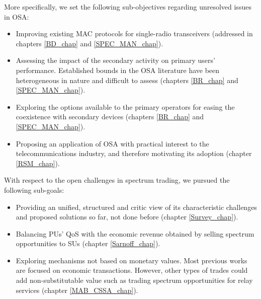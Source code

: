 More specifically, we set the following sub-objectives regarding unresolved issues in OSA: 
\begin{itemize}
\item Improving existing MAC protocols for single-radio transceivers (addressed in chapters \ref{BD_chap} and \ref{SPEC_MAN_chap}).
\item Assessing the impact of the secondary activity on primary users' performance. Established bounds in the OSA literature have been heterogeneous in nature and difficult to assess (chapters \ref{BR_chap} and \ref{SPEC_MAN_chap}).
\item Exploring the options available to the primary operators for easing the coexistence with secondary devices (chapters \ref{BR_chap} and \ref{SPEC_MAN_chap}).
\item Proposing an application of OSA with practical interest to the telecommunications industry, and therefore motivating its adoption (chapter \ref{RSM_chap}).
\end{itemize}

With respect to the open challenges in spectrum trading, we pursued the following sub-goals:
\begin{itemize}
\item Providing an unified, structured and critic view of its characteristic challenges and proposed solutions so far, not done before (chapter \ref{Survey_chap}).
\item Balancing PUs' QoS with the economic revenue obtained by selling spectrum opportunities to SUs (chapter \ref{Sarnoff_chap}). 
\item Exploring mechanisms not based on monetary values. Most previous works are focused on economic transactions. However, other types of trades could add non-substitutable value such as trading spectrum opportunities for relay services (chapter \ref{MAB_CSSA_chap}).
\end{itemize}

